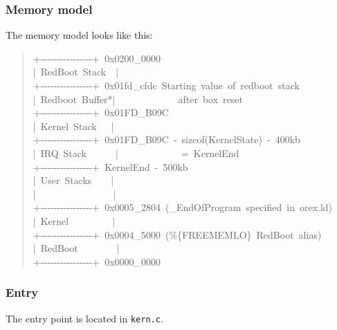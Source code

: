 \documentclass[letterpaper]{article}
\begin{document}
\subsubsection{Memory model%
  \label{memory-model}%
}

The memory model looks like this:
%
\begin{quote}{\ttfamily \raggedright \noindent
+-{}-{}-{}-{}-{}-{}-{}-{}-{}-{}-{}-{}-{}-{}-{}-+~0x0200\_0000\\
|~RedBoot~Stack~~|\\
+-{}-{}-{}-{}-{}-{}-{}-{}-{}-{}-{}-{}-{}-{}-{}-+~0x01fd\_cfdc~Starting~value~of~redboot~stack\\
|~Redboot~Buffer*|~~~~~~~~~~~~~after~box~reset\\
+-{}-{}-{}-{}-{}-{}-{}-{}-{}-{}-{}-{}-{}-{}-{}-+~0x01FD\_B09C\\
|~Kernel~Stack~~~|\\
+-{}-{}-{}-{}-{}-{}-{}-{}-{}-{}-{}-{}-{}-{}-{}-+~0x01FD\_B09C~-~sizeof(KernelState)~-~400kb\\
|~IRQ~Stack~~~~~~|~~~~~~~~~~~~~=~KernelEnd\\
+-{}-{}-{}-{}-{}-{}-{}-{}-{}-{}-{}-{}-{}-{}-{}-+~KernelEnd~-~500kb\\
|~User~Stacks~~~~|\\
|~~~~~~~~~~~~~~~~|\\
+-{}-{}-{}-{}-{}-{}-{}-{}-{}-{}-{}-{}-{}-{}-{}-+~0x0005\_2804~(\_EndOfProgram~specified~in~orex.ld)\\
|~Kernel~~~~~~~~~|\\
+-{}-{}-{}-{}-{}-{}-{}-{}-{}-{}-{}-{}-{}-{}-{}-+~0x0004\_5000~(\%\{FREEMEMLO\}~RedBoot~alias)\\
|~RedBoot~~~~~~~~|\\
+-{}-{}-{}-{}-{}-{}-{}-{}-{}-{}-{}-{}-{}-{}-{}-+~0x0000\_0000
}
\end{quote}


\subsubsection{Entry%
  \label{entry}%
}

The entry point is located in \texttt{kern.c}.
\end{document}
